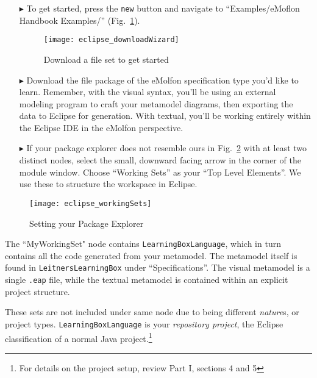 \begin{itemize}

\item[$\blacktriangleright$] To get started, press the \texttt{new} button and navigate to ``Examples/eMoflon Handbook Examples/''
(Fig.~\ref{fig:downloadWizard}).

\begin{figure}[htbp]
	\centering
  \texttt{[image: eclipse\_downloadWizard]}
	\caption{Download a file set to get started}
	\label{fig:downloadWizard}
\end{figure}

\item[$\blacktriangleright$] Download the file package of the eMolfon specification type you'd like to learn. Remember, with the visual syntax, you'll be
using an external modeling program to craft your metamodel diagrams, then exporting the data to Eclipse for generation. With textual, you'll be working entirely
within the Eclipse IDE in the eMolfon perspective.

\newpage

\vspace*{0.5cm}

\item[$\blacktriangleright$] If your package explorer does not resemble ours in Fig.~\ref{fig:workingSets} with at least two distinct nodes, select the
small, downward facing arrow in the corner of the module window. Choose ``Working Sets'' as your ``Top Level Elements''. We use these to structure the workspace
in Eclipse.

\vspace{0.75cm}

\end{itemize}

\begin{figure}[htbp]
	\centering
  \texttt{[image: eclipse\_workingSets]}
	\caption{Setting your Package Explorer}
	\label{fig:workingSets}
\end{figure}

The ``MyWorkingSet" node contains \texttt{Learn\-ing\-Box\-Lang\-uage}, which in turn contains all the code generated from your metamodel. The metamodel itself
is found in \texttt{Leit\-ners\-Learn\-ing\-Box} under ``Specifications''. The visual metamodel is a single \texttt{.eap} file, while the textual metamodel is
contained within an explicit project structure. 

These sets are not included under same node due to being different \emph{nature}s, or project types. \texttt{Learning\-Box\-Language} is your
\emph{repository project}, the Eclipse classification of a normal Java project.\footnote{For details on the project setup, review Part I, sections 4 and 5} 

